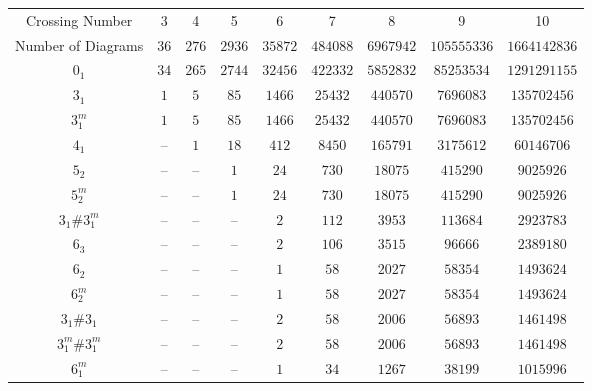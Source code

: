 \documentclass[amsmath,secnumarabic,floatfix,amssymb,nofootinbib,nobibnotes,letterpaper,11pt,tightenlines,showkeys]{revtex4}
\theoremstyle{definition}
\begin{document}
\begin{table}[tp]
\begin{ruledtabular}
\begin{tabular}{ccccccccc}
Crossing Number &
3 & 4 & 5 & 6 & 7 & 8 & 9 & 10 \\ 
Number of Diagrams & 
$\num{36}$ & 
$\num{276}$ & 
$\num{2936}$ & 
$\num{35872}$ & 
$\num{484088}$ & 
$\num{6967942}$ & 
$\num{105555336}$ & 
$\num{1664142836}$\\ \hline
$0_1$ & 
$\num{34}$ & 
$\num{265}$ & 
$\num{2744}$ & 
$\num{32456}$ & 
$\num{422332}$ & 
$\num{5852832}$ & 
$\num{85253534}$ & 
$\num{1291291155}$\\ 
$3_{1}^{}$ & 
$\num{1}$ & 
$\num{5}$ & 
$\num{85}$ & 
$\num{1466}$ & 
$\num{25432}$ & 
$\num{440570}$ & 
$\num{7696083}$ & 
$\num{135702456}$\\ 
$3_{1}^{m}$ & 
$\num{1}$ & 
$\num{5}$ & 
$\num{85}$ & 
$\num{1466}$ & 
$\num{25432}$ & 
$\num{440570}$ & 
$\num{7696083}$ & 
$\num{135702456}$\\ 
$4_{1}^{}$ & 
-- & 
$\num{1}$ & 
$\num{18}$ & 
$\num{412}$ & 
$\num{8450}$ & 
$\num{165791}$ & 
$\num{3175612}$ & 
$\num{60146706}$\\ 
$5_{2}^{}$ & 
-- & 
-- & 
$\num{1}$ & 
$\num{24}$ & 
$\num{730}$ & 
$\num{18075}$ & 
$\num{415290}$ & 
$\num{9025926}$\\ 
$5_{2}^{m}$ & 
-- & 
-- & 
$\num{1}$ & 
$\num{24}$ & 
$\num{730}$ & 
$\num{18075}$ & 
$\num{415290}$ & 
$\num{9025926}$\\ 
$3_{1}^{}\#3_{1}^{m}$ & 
-- & 
-- & 
-- & 
$\num{2}$ & 
$\num{112}$ & 
$\num{3953}$ & 
$\num{113684}$ & 
$\num{2923783}$\\ 
$6_{3}^{}$ & 
-- & 
-- & 
-- & 
$\num{2}$ & 
$\num{106}$ & 
$\num{3515}$ & 
$\num{96666}$ & 
$\num{2389180}$\\ 
$6_{2}^{}$ & 
-- & 
-- & 
-- & 
$\num{1}$ & 
$\num{58}$ & 
$\num{2027}$ & 
$\num{58354}$ & 
$\num{1493624}$\\ 
$6_{2}^{m}$ & 
-- & 
-- & 
-- & 
$\num{1}$ & 
$\num{58}$ & 
$\num{2027}$ & 
$\num{58354}$ & 
$\num{1493624}$\\ 
$3_{1}^{}\#3_{1}^{}$ & 
-- & 
-- & 
-- & 
$\num{2}$ & 
$\num{58}$ & 
$\num{2006}$ & 
$\num{56893}$ & 
$\num{1461498}$\\ 
$3_{1}^{m}\#3_{1}^{m}$ & 
-- & 
-- & 
-- & 
$\num{2}$ & 
$\num{58}$ & 
$\num{2006}$ & 
$\num{56893}$ & 
$\num{1461498}$\\ 
$6_{1}^{m}$ & 
-- & 
-- & 
-- & 
$\num{1}$ & 
$\num{34}$ & 
$\num{1267}$ & 
$\num{38199}$ & 
$\num{1015996}$\\ 

\end{tabular}
\end{ruledtabular}
\end{table}
\end{document}
